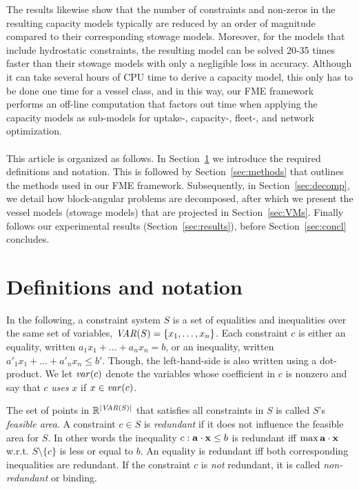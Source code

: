 The results likewise show that the number of constraints and non-zeros in the resulting capacity models typically are reduced by an order of magnitude compared to their corresponding stowage models. Moreover, for the models that include hydrostatic constraints, the resulting model can be solved 20-35 times faster than their stowage models with only a negligible loss in accuracy. Although it can take several hours of CPU time to derive a capacity model, this only has to be done one time for a vessel class, and in this way, our FME framework performs an off-line computation that factors out time when applying the capacity models as sub-models for uptake-, capacity-, fleet-, and network optimization.
\\
\\
This article is organized as follows. In Section~\ref{sec:defs} we introduce the required definitions and notation. This is followed by Section~\ref{sec:methods} that outlines the methods used in our FME framework. Subsequently, in Section~\ref{sec:decomp}, we detail how block-angular problems are decomposed, after which we present the vessel models (stowage models) that are projected in Section~\ref{sec:VMs}. Finally follows our experimental results (Section~\ref{sec:results}), before Section~\ref{sec:concl} concludes.

\section{Definitions and notation}\label{sec:defs}
In the following, a constraint system $S$ is a set of equalities and inequalities over the same set of variables, $\mathit{VAR}(S)=\{x_1,\ldots, x_n\}$. 
Each constraint $c$ is either an equality, written $a_1x_1 + \ldots +a_nx_n = b$, or an inequality, written $a'_1x_1 + \ldots +a'_nx_n\leq b'$. Though, the left-hand-side is also written using a dot-product. 
%
We let $\mathit{var}(c)$ denote the variables whose coefficient in $c$ is nonzero and say that $c$ \emph{uses} $x$ if $x\in \mathit{var}(c)$.

The set of points in $\mathbb{R}^{|\mathit{VAR}(S)|}$ that satisfies all constraints in $S$ is called $S$'s \emph{feasible area}. A constraint $c\in S$ is \emph{redundant} if it does not influence the feasible area for $S$. In other words the inequality $c: \mathbf{a}\cdot\mathbf{x}\leq b$ is redundant iff $\max \mathbf{a}\cdot\mathbf{x}$ w.r.t. $S\setminus\{c\}$ is less or equal to $b$.
An equality is redundant iff both corresponding inequalities are redundant.
If the constraint $c$ is \emph{not} redundant, it is called \emph{non-redundant} or binding.

